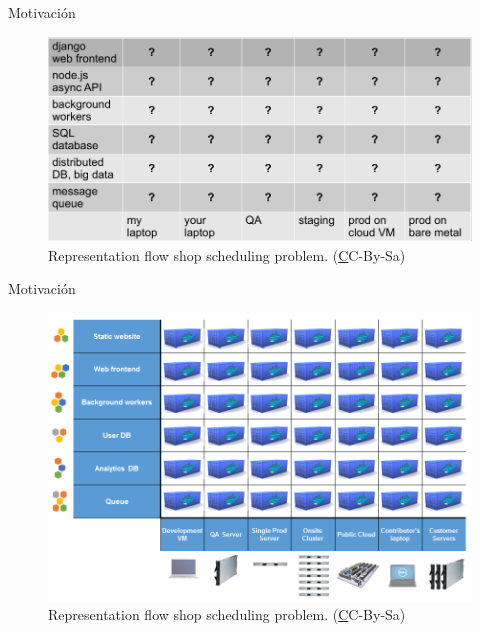 \documentclass{bredelebeamer}
\begin{document}
\begin{frame}{Motivación}
	\begin{figure}
		\centering
\includegraphics[width=\textwidth,height=0.8\textheight,keepaspectratio]{images/matrix}
		\caption{Representation flow shop scheduling problem. (\href{http://yetanothermathprogrammingconsultant.blogspot.com/2012_04_01_archive.html} CC-By-Sa)}
	\end{figure}
\end{frame}


\begin{frame}{Motivación}
	\begin{figure}
		\centering
\includegraphics[width=\textwidth,height=0.8\textheight,keepaspectratio]{images/eliminates-matrix-from-hell}
		\caption{Representation flow shop scheduling problem. (\href{http://yetanothermathprogrammingconsultant.blogspot.com/2012_04_01_archive.html} CC-By-Sa)}
	\end{figure}
\end{frame}
\end{document}
